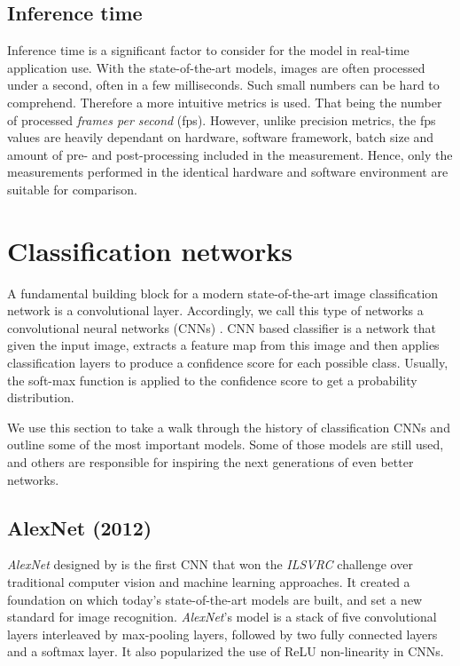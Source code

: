 \subsection{Inference time}
Inference time is a significant factor to consider for the model in real-time application use. With the state-of-the-art models, images are often processed under a second, often in a few milliseconds. Such small numbers can be hard to comprehend. Therefore a more intuitive metrics is used. That being the number of processed \textit{frames per second} (fps). However, unlike precision metrics, the fps values are heavily dependant on hardware, software framework, batch size and amount of pre- and post-processing included in the measurement. Hence, only the measurements performed in the identical hardware and software environment are suitable for comparison.

\section{Classification networks}
\label{sec:clsnets}
A fundamental building block for a modern state-of-the-art image classification network is a convolutional layer. Accordingly, we call this type of networks a convolutional neural networks (CNNs) \cite[ch.~9]{bib:dlbook}. CNN based classifier is a network that given the input image, extracts a feature map from this image and then applies classification layers to produce a confidence score for each possible class. Usually, the soft-max function is applied to the confidence score to get a probability distribution.

We use this section to take a walk through the history of classification CNNs and outline some of the most important models. Some of those models are still used, and others are responsible for inspiring the next generations of even better networks.

\subsection{AlexNet (2012)}
\textit{AlexNet} designed by \citeauthor{bib:alexnet} \cite{bib:alexnet} is the first CNN that won the \textit{ILSVRC} challenge over traditional computer vision and machine learning approaches. It created a foundation on which today's state-of-the-art models are built, and set a new standard for image recognition. \textit{AlexNet}'s model is a stack of five convolutional layers interleaved by max-pooling layers, followed by two fully connected layers and a softmax layer. It also popularized the use of ReLU non-linearity in CNNs.

